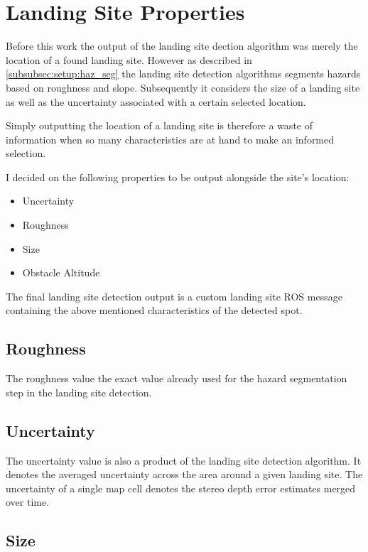 \section{Landing Site Properties}\label{sec:LSproperties}

Before this work the output of the landing site dection algorithm was merely the location of a found landing site. However as described in \cref{subsubsec:setup:haz_seg} the landing site detection algorithms segments hazards based on roughness and slope. Subsequently it considers the size of a landing site as well as the uncertainty associated with a certain selected location. 

Simply outputting the location of a landing site is therefore a waste of information when so many characteristics are at hand to make an informed selection. 

I decided on the following properties to be output alongside the site's location:

\begin{itemize}
    \item Uncertainty
    \item Roughness
    \item Size
    \item Obstacle Altitude
\end{itemize}
The final landing site detection output is a custom landing site ROS message containing the above mentioned characteristics of the detected spot.

\subsection{Roughness}

The roughness value the exact value already used for the hazard segmentation step in the landing site detection. 

\subsection{Uncertainty}

The uncertainty value is also a product of the landing site detection algorithm. It denotes the averaged uncertainty across the area around a given landing site. The uncertainty of a single map cell denotes the stereo depth error estimates merged over time.

\subsection{Size}


